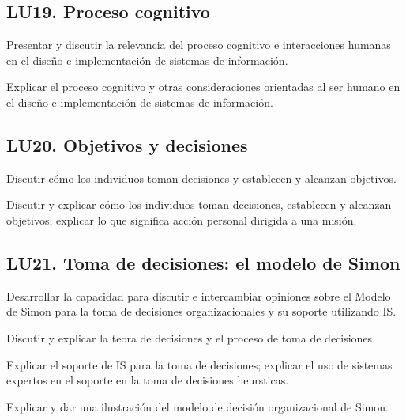 \subsection{LU19. Proceso cognitivo}\label{sec:LU19}
\begin{LearningUnit}
\begin{LUGoal}
\item Presentar y discutir la relevancia del proceso cognitivo e interacciones humanas en el diseño e implementación de sistemas de información.
\end{LUGoal}

\begin{LUObjective}
\item Explicar el proceso cognitivo y otras consideraciones orientadas al ser humano en el diseño e implementación de sistemas de información.
\end{LUObjective}
\end{LearningUnit}

\subsection{LU20. Objetivos y decisiones}\label{sec:LU20}
\begin{LearningUnit}
\begin{LUGoal}
\item Discutir cómo los individuos toman decisiones y establecen y alcanzan objetivos.
\end{LUGoal}

\begin{LUObjective}
\item Discutir y explicar cómo los individuos toman decisiones, establecen y alcanzan objetivos; explicar lo que significa acción personal dirigida a una misión.
\end{LUObjective}
\end{LearningUnit}

\subsection{LU21. Toma de decisiones: el modelo de Simon}\label{sec:LU21}
\begin{LearningUnit}
\begin{LUGoal}
\item Desarrollar la capacidad para discutir e intercambiar opiniones sobre  el Modelo de Simon para la toma de decisiones organizacionales y su soporte utilizando IS.
\end{LUGoal}

\begin{LUObjective}
\item Discutir y explicar la teor­a de decisiones y el proceso de toma de decisiones.
\item Explicar el soporte de IS para la toma de decisiones; explicar el uso de sistemas expertos en el soporte en la toma de decisiones heur­sticas.
\item Explicar y dar una ilustración del modelo de decisión organizacional de Simon.
\end{LUObjective}
\end{LearningUnit}

